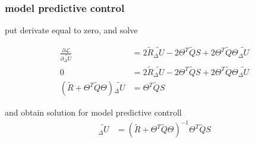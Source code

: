 \documentclass{beamer}
\begin{document}
\begin{frame}
  
  \frametitle{\bf model predictive control}

  put derivate equal to zero, and solve

  \begin{align*}
    \frac{\partial \mathcal{L}}{\partial {\tilde{_\Delta U}}} & = 2 \tilde{R} \tilde{_\Delta U} - 2\Theta^T\tilde{Q}S + 2\Theta^T\tilde{Q}\Theta\tilde{_\Delta U} \\
    0 &= 2 \tilde{R} \tilde{_\Delta U} - 2\Theta^T\tilde{Q}S + 2\Theta^T\tilde{Q}\Theta\tilde{_\Delta U} \\
    (\tilde{R} + \Theta^T\tilde{Q}\Theta)\tilde{_\Delta U}  &= \Theta^T\tilde{Q}S 
  \end{align*}  

  and obtain solution for model predictive controll
  \begin{align*}
    \tilde{_\Delta U} &= (\tilde{R} + \Theta^T\tilde{Q}\Theta)^{-1} \Theta^T\tilde{Q}S
  \end{align*} 

\end{frame}
\end{document}
